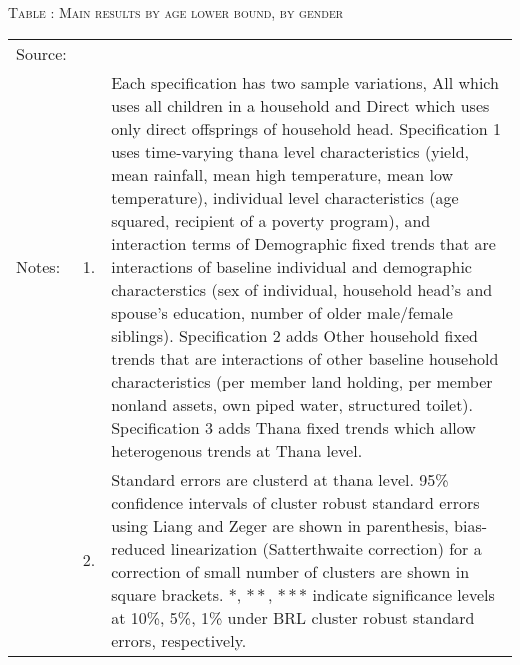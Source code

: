 \begin{table}
\hfil\textsc{\footnotesize Table \thetable: Main results by age lower bound, by gender\label{MainAgHHDefIsResultsTable1}}\\
\setlength{\tabcolsep}{1pt}
\renewcommand{\arraystretch}{.55}
\hspace{-1.5cm}

\renewcommand{\arraystretch}{1}
\hfil\begin{tabular}{>{\hfill\scriptsize}p{1cm}<{}>{\hfill\scriptsize}p{.5cm}<{}>{\scriptsize}p{12cm}<{\hfill}}
Source:& \multicolumn{2}{l}{\scriptsize Compiled from IFPRI data. }\\[-1ex]
Notes:& 1. & Each specification has two sample variations, \textsf{All} which uses all children in a household and \textsf{Direct} which uses only direct offsprings of household head. \textsf{Specification 1} uses time-varying thana level characteristics (yield, mean rainfall, mean high temperature, mean low temperature), individual level characteristics (age squared, recipient of a poverty program), and interaction terms of \textsf{Demographic fixed trends} that are interactions of baseline individual and demographic characterstics (sex of individual, household head's and spouse's education, number of older male/female siblings). \textsf{Specification 2} adds \textsf{Other household fixed trends} that are interactions of other baseline household characteristics (per member land holding, per member nonland assets, own piped water, structured toilet). \textsf{Specification 3} adds \textsf{Thana fixed trends} which allow heterogenous trends at Thana level. \\[-1ex]
& 2. & Standard errors are clusterd at thana level. 95\% confidence intervals of cluster robust standard errors using Liang and Zeger are shown in parenthesis, bias-reduced linearization (Satterthwaite correction) for a correction of small number of clusters are shown in square brackets. $*$, $**$, $***$ indicate significance levels at 10\%, 5\%, 1\% under BRL cluster robust standard errors, respectively.\end{tabular}
\end{table}


